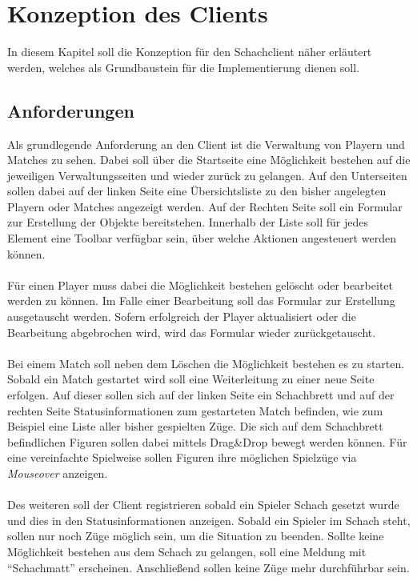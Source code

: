 
\chapter{Konzeption des Clients}
In diesem Kapitel soll die Konzeption für den Schachclient näher erläutert werden, welches als Grundbaustein für die Implementierung dienen soll. 

\section{Anforderungen}
Als grundlegende Anforderung an den Client ist die Verwaltung von Playern und Matches zu sehen. Dabei soll über die Startseite eine Möglichkeit bestehen auf die jeweiligen Verwaltungsseiten und wieder zurück zu gelangen. Auf den Unterseiten sollen dabei auf der linken Seite eine Übersichtsliste zu den bisher angelegten Playern oder Matches angezeigt werden. Auf der Rechten Seite soll ein Formular zur Erstellung der Objekte bereitstehen. Innerhalb der Liste soll für jedes Element eine Toolbar verfügbar sein, über welche Aktionen angesteuert werden können. \\
\\
Für einen Player muss dabei die Möglichkeit bestehen gelöscht oder bearbeitet werden zu können. Im Falle einer Bearbeitung soll das Formular zur Erstellung ausgetauscht werden. Sofern erfolgreich der Player aktualisiert oder die Bearbeitung abgebrochen wird, wird das Formular wieder zurückgetauscht.\\
\\
Bei einem Match soll neben dem Löschen die Möglichkeit bestehen es zu starten. Sobald ein Match gestartet wird soll eine Weiterleitung zu einer neue Seite erfolgen. Auf dieser sollen sich auf der linken Seite ein Schachbrett und auf der rechten Seite Statusinformationen zum gestarteten Match befinden, wie zum Beispiel eine Liste aller bisher gespielten Züge. Die sich auf dem Schachbrett befindlichen Figuren sollen dabei mittels Drag\&Drop bewegt werden können. Für eine vereinfachte Spielweise sollen Figuren ihre möglichen Spielzüge via \textit{Mouseover} anzeigen.\\
\\
Des weiteren soll der Client registrieren sobald ein Spieler Schach gesetzt wurde und dies in den Statusinformationen anzeigen. Sobald ein Spieler im Schach steht, sollen nur noch Züge möglich sein, um die Situation zu beenden. Sollte keine Möglichkeit bestehen aus dem Schach zu gelangen, soll eine Meldung mit \enquote{Schachmatt} erscheinen. Anschließend sollen keine Züge mehr durchführbar sein.

